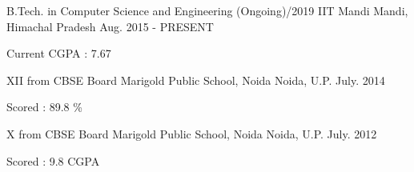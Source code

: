 \begin{cventries}
  \cventry
    {B.Tech. in Computer Science and Engineering (Ongoing)/2019}
    {IIT Mandi}
    {Mandi, Himachal Pradesh}
    {Aug. 2015 - PRESENT}
    {
      \begin{cvitems}
        \item {Current CGPA : 7.67}
      \end{cvitems}
    }
      \cventry
    {XII from CBSE Board}
    {Marigold Public School, Noida }
    {Noida, U.P.}
    {July. 2014}
    {
      \begin{cvitems}
        \item {Scored : 89.8 \%}
      \end{cvitems}
    }
      \cventry
    {X from CBSE Board}
    {Marigold Public School, Noida }
    {Noida, U.P.}
    {July. 2012}
    {
      \begin{cvitems}
        \item {Scored : 9.8 CGPA}
      \end{cvitems}
    }
\end{cventries}
